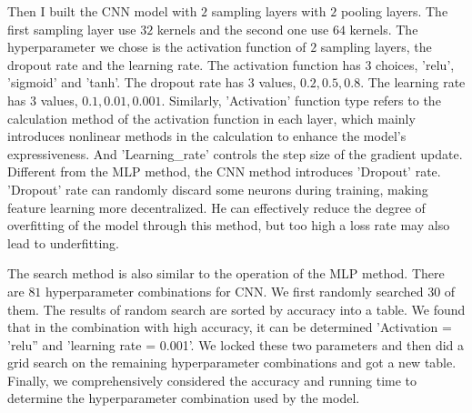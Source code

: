 Then I built the CNN model with $2$ sampling layers with $2$ pooling layers. The first sampling layer use $32$ kernels and the second one use $64$ kernels. The hyperparameter we chose is the activation function of $2$ sampling layers, the dropout rate and the learning rate. The activation function has $3$ choices, 'relu', 'sigmoid' and 'tanh'. The dropout rate has $3$ values, $0.2,0.5,0.8$. The learning rate has $3$ values, $0.1,0.01,0.001$. Similarly, 'Activation' function type refers to the calculation method of the activation function in each layer, which mainly introduces nonlinear methods in the calculation to enhance the model's expressiveness. And 'Learning\_rate' controls the step size of the gradient update. Different from the MLP method, the CNN method introduces 'Dropout' rate. 'Dropout' rate can randomly discard some neurons during training, making feature learning more decentralized. He can effectively reduce the degree of overfitting of the model through this method, but too high a loss rate may also lead to underfitting.

The search method is also similar to the operation of the MLP method. There are $81$ hyperparameter combinations for CNN. We first randomly searched $30$ of them. The results of random search are sorted by accuracy into a table. We found that in the combination with high accuracy, it can be determined 'Activation = 'relu'' and 'learning rate = 0.001'. We locked these two parameters and then did a grid search on the remaining hyperparameter combinations and got a new table. Finally, we comprehensively considered the accuracy and running time to determine the hyperparameter combination used by the model.

\noindent
